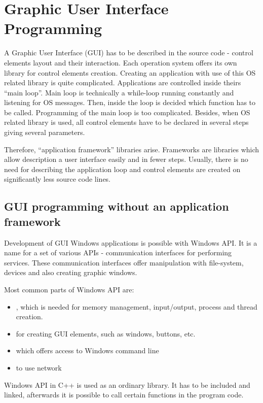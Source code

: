 \chapter{Graphic User Interface Programming}
\vspace{-10mm}

A Graphic User Interface (GUI) has to be described in the source code - control elements layout and their interaction. Each operation system offers its own library for control elements creation. Creating an application with use of this OS related library is quite complicated. Applications are controlled inside theirs ``main loop''. Main loop is technically a while-loop running constantly and listening for OS messages. Then, inside the loop is decided which function has to be called. Programming of the main loop is too complicated. Besides, when OS related library is used, all control elements have to be declared in several steps giving several parameters.

Therefore, ``application framework'' libraries arise. Frameworks are libraries which allow description a user interface easily and in fewer steps. Usually, there is no need for describing the application loop and control elements are created on significantly less source code lines.


\section{GUI programming without an application framework}
\label{noqt}

Development of GUI Windows applications is possible with Windows API. It is a name for a set of various APIs - communication interfaces for performing services. These communication interfaces offer manipulation with file-system, devices and also creating graphic windows.

Most common parts of Windows API are:
\begin{itemize}
\item {}, which is needed for memory management, input/output, process and thread creation.
\item {} for creating GUI elements, such as windows, buttons, etc.
\item {} which offers access to Windows command line
\item {} to use network
\end{itemize}

Windows API in C++ is used as an ordinary library. It has to be included and linked, afterwards it is possible to call certain functions in the program code.

